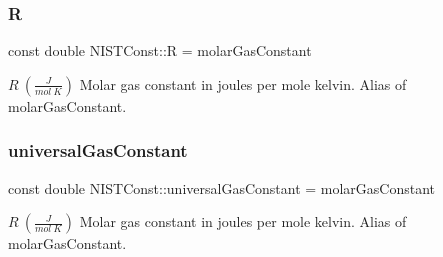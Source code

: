 \subsubsection{\texorpdfstring{R}{R}}
{\footnotesize\ttfamily const double N\+I\+S\+T\+Const\+::R = molar\+Gas\+Constant}

$R \ (\frac{J}{mol\ K})$ Molar gas constant in joules per mole kelvin. Alias of molar\+Gas\+Constant. \mbox{\label{group___molar_gas_constant_ga081ff52b90c1476a7c7e55dcee67fa8e}} 
\subsubsection{\texorpdfstring{universal\+Gas\+Constant}{universalGasConstant}}
{\footnotesize\ttfamily const double N\+I\+S\+T\+Const\+::universal\+Gas\+Constant = molar\+Gas\+Constant}

$R \ (\frac{J}{mol\ K})$ Molar gas constant in joules per mole kelvin. Alias of molar\+Gas\+Constant. 